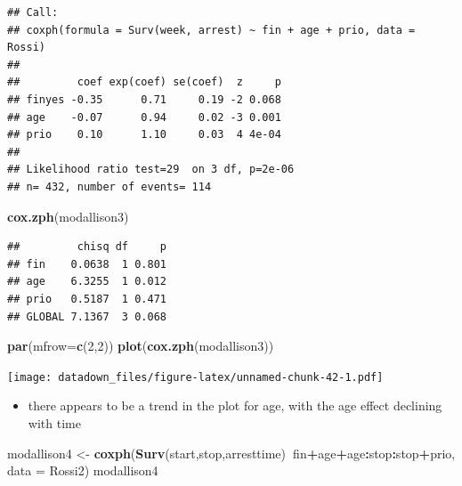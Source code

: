 \documentclass[
]{book}
\newenvironment{Shaded}{\begin{snugshade}}{\end{snugshade}}
\newcommand{\DataTypeTok}[1]{\textcolor[rgb]{0.13,0.29,0.53}{#1}}
\newcommand{\DecValTok}[1]{\textcolor[rgb]{0.00,0.00,0.81}{#1}}
\newcommand{\KeywordTok}[1]{\textcolor[rgb]{0.13,0.29,0.53}{\textbf{#1}}}
\newcommand{\NormalTok}[1]{#1}
\newcommand{\OperatorTok}[1]{\textcolor[rgb]{0.81,0.36,0.00}{\textbf{#1}}}
\newcommand{\StringTok}[1]{\textcolor[rgb]{0.31,0.60,0.02}{#1}}
\providecommand{\tightlist}{%
  \setlength{\itemsep}{0pt}\setlength{\parskip}{0pt}}
\begin{document}
\begin{verbatim}
## Call:
## coxph(formula = Surv(week, arrest) ~ fin + age + prio, data = Rossi)
## 
##         coef exp(coef) se(coef)  z     p
## finyes -0.35      0.71     0.19 -2 0.068
## age    -0.07      0.94     0.02 -3 0.001
## prio    0.10      1.10     0.03  4 4e-04
## 
## Likelihood ratio test=29  on 3 df, p=2e-06
## n= 432, number of events= 114
\end{verbatim}

\begin{Shaded}
\begin{Highlighting}[]
\KeywordTok{cox.zph}\NormalTok{(modallison3)}
\end{Highlighting}
\end{Shaded}

\begin{verbatim}
##         chisq df     p
## fin    0.0638  1 0.801
## age    6.3255  1 0.012
## prio   0.5187  1 0.471
## GLOBAL 7.1367  3 0.068
\end{verbatim}

\begin{Shaded}
\begin{Highlighting}[]
\KeywordTok{par}\NormalTok{(}\DataTypeTok{mfrow=}\KeywordTok{c}\NormalTok{(}\DecValTok{2}\NormalTok{,}\DecValTok{2}\NormalTok{))}
\KeywordTok{plot}\NormalTok{(}\KeywordTok{cox.zph}\NormalTok{(modallison3))}
\end{Highlighting}
\end{Shaded}

\texttt{[image: datadown\_files/figure-latex/unnamed-chunk-42-1.pdf]}

\begin{itemize}
\tightlist
\item
  there appears to be a trend in the plot for age, with the age effect declining with time
\end{itemize}

\begin{Shaded}
\begin{Highlighting}[]
\NormalTok{modallison4 <-}\StringTok{ }\KeywordTok{coxph}\NormalTok{(}\KeywordTok{Surv}\NormalTok{(start,stop,arresttime)}\OperatorTok{~}\NormalTok{fin}\OperatorTok{+}\NormalTok{age}\OperatorTok{+}\NormalTok{age}\OperatorTok{:}\NormalTok{stop}\OperatorTok{:}\NormalTok{stop}\OperatorTok{+}\NormalTok{prio, }\DataTypeTok{data =}\NormalTok{ Rossi2)}
\NormalTok{modallison4}
\end{Highlighting}
\end{Shaded}
\end{document}
